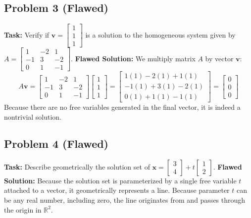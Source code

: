 \documentclass[11pt]{article}
\begin{document}
\vspace{2cm}

\subsection*{Problem 3 (Flawed)}
\textbf{Task:} Verify if $\mathbf{v} = \begin{bmatrix} 1 \\ 1 \\ 1 \end{bmatrix}$ is a solution to the homogeneous system given by $A = \begin{bmatrix} 1 & -2 & 1 \\ -1 & 3 & -2 \\ 0 & 1 & -1 \end{bmatrix}$.
\textbf{Flawed Solution:}
We multiply matrix $A$ by vector $\mathbf{v}$:
\[ 
A\mathbf{v} = \begin{bmatrix} 1 & -2 & 1 \\ -1 & 3 & -2 \\ 0 & 1 & -1 \end{bmatrix} \begin{bmatrix} 1 \\ 1 \\ 1 \end{bmatrix} = \begin{bmatrix} 1(1) - 2(1) + 1(1) \\ -1(1) + 3(1) - 2(1) \\ 0(1) + 1(1) - 1(1) \end{bmatrix} = \begin{bmatrix} 0 \\ 0 \\ 0 \end{bmatrix} 
\]
Because there are no free variables generated in the final vector, it is indeed a nontrivial solution.

\vspace{2cm}

\subsection*{Problem 4 (Flawed)}
\textbf{Task:} Describe geometrically the solution set of $\mathbf{x} = \begin{bmatrix} 3 \\ 4 \end{bmatrix} + t \begin{bmatrix} 1 \\ 2 \end{bmatrix}$.
\textbf{Flawed Solution:}
Because the solution set is parameterized by a single free variable $t$ attached to a vector, it geometrically represents a line. Because parameter $t$ can be any real number, including zero, the line originates from and passes through the origin in $\mathbb{R}^2$.
\end{document}
